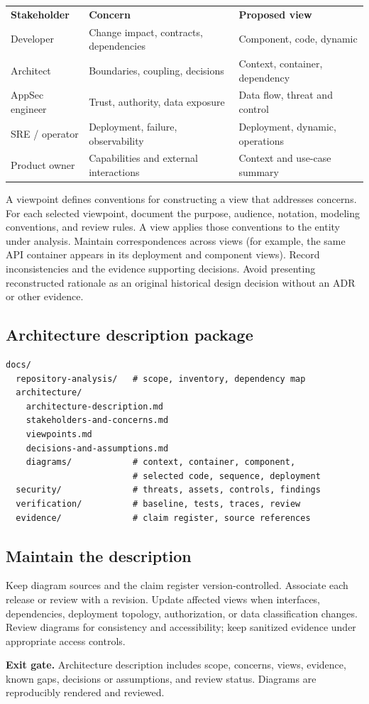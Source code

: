 \documentclass[11pt,letterpaper]{article}
\newcommand{\gate}[1]{\par\noindent\colorbox{pale}{\parbox{\dimexpr\linewidth-2\fboxsep\relax}{\textbf{\color{teal}Exit gate.} #1}}\par}
\begin{document}
\noindent\begin{tabularx}{\linewidth}{@{}P{1.25in}Y Y@{}}
\color{white}\textbf{Stakeholder}&\color{white}\textbf{Concern}&\color{white}\textbf{Proposed view}\\
Developer & Change impact, contracts, dependencies & Component, code, dynamic\\
Architect & Boundaries, coupling, decisions & Context, container, dependency\\
AppSec engineer & Trust, authority, data exposure & Data flow, threat and control\\
SRE / operator & Deployment, failure, observability & Deployment, dynamic, operations\\
Product owner & Capabilities and external interactions & Context and use-case summary\\
\bottomrule
\end{tabularx}
A viewpoint defines conventions for constructing a view that addresses concerns. For each selected viewpoint, document the purpose, audience, notation, modeling conventions, and review rules. A view applies those conventions to the entity under analysis. Maintain correspondences across views (for example, the same API container appears in its deployment and component views). Record inconsistencies and the evidence supporting decisions. Avoid presenting reconstructed rationale as an original historical design decision without an ADR or other evidence.
\subsection{Architecture description package}
\begin{lstlisting}
docs/
  repository-analysis/   # scope, inventory, dependency map
  architecture/
    architecture-description.md
    stakeholders-and-concerns.md
    viewpoints.md
    decisions-and-assumptions.md
    diagrams/            # context, container, component,
                         # selected code, sequence, deployment
  security/              # threats, assets, controls, findings
  verification/          # baseline, tests, traces, review
  evidence/              # claim register, source references
\end{lstlisting}
\subsection{Maintain the description}
Keep diagram sources and the claim register version-controlled. Associate each release or review with a revision. Update affected views when interfaces, dependencies, deployment topology, authorization, or data classification changes. Review diagrams for consistency and accessibility; keep sanitized evidence under appropriate access controls.
\gate{Architecture description includes scope, concerns, views, evidence, known gaps, decisions or assumptions, and review status. Diagrams are reproducibly rendered and reviewed.}
\clearpage
\end{document}

